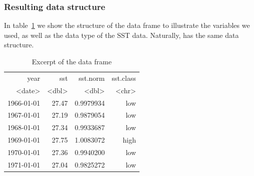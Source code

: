 \subsubsection{Resulting data structure}
In table~\ref{hd:sst-head} we show the structure of the  data frame to illustrate the variables we used, as well as the data type of the SST data. Naturally,  has the same data structure.
\begin{table}[H]
	\centering
	\ttfamily
	\begin{tabular}{r r r r}
		\toprule
		\toprule
		year & sst & sst.norm & sst.class \\
		<date> &   <dbl>   &  <dbl> &    <chr> \\
		\midrule
		1966-01-01 & 27.47 & 0.9979934 &  low \\
		1967-01-01 & 27.19 & 0.9879054 &  low \\
		1968-01-01 & 27.34 & 0.9933687 &  low \\
		1969-01-01 & 27.75 & 1.0083072 & high \\
		1970-01-01 & 27.36 & 0.9940200 &  low \\
		1971-01-01 & 27.04 & 0.9825272 &  low \\
		\bottomrule
	\end{tabular}
	\caption{Excerpt of the  data frame}
	\label{hd:sst-head}
\end{table}

